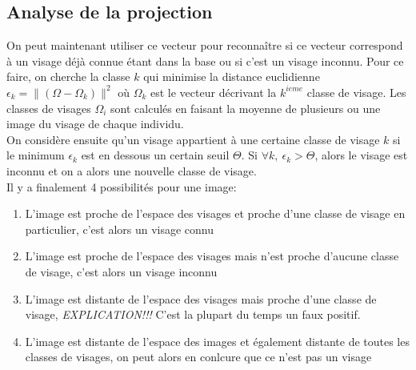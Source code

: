\documentclass[12pt,french]{article}
\begin{document}
\subsection{Analyse de la projection}
On peut maintenant utiliser ce vecteur pour reconnaître si ce vecteur correspond à un visage déjà connue étant dans la base ou si c'est un visage inconnu.
Pour ce faire, on cherche la classe $k$ qui minimise la distance euclidienne $\epsilon_k = \|(\Omega - \Omega_k)\|^2$
 où $\Omega_k$ est le vecteur décrivant la $k^{ieme}$ classe de visage. Les classes de visages $\Omega_i$ sont calculés en faisant la moyenne de plusieurs ou une image du visage de chaque individu. \\
 On considère ensuite qu'un visage appartient à une certaine classe de visage $k$ si le minimum $\epsilon_k$ est en dessous un certain seuil $\Theta$.
 Si $\forall k,~\epsilon_k > \Theta$, alors le visage est inconnu et on a alors une nouvelle classe de visage. \\
 Il y a finalement 4 possibilités pour une image:
\begin{enumerate}
  \item L'image est proche de l'espace des visages et proche d'une classe de visage en particulier, c'est alors un visage connu
  \item L'image est proche de l'espace des visages mais n'est proche d'aucune classe de visage, c'est alors un visage inconnu
  \item L'image est distante de l'espace des visages mais proche d'une classe de visage, \emph{EXPLICATION!!!} C'est la plupart du temps un faux positif.
  \item L'image est distante de l'espace des images et également distante de toutes les classes de visages, on peut alors en conlcure que ce n'est pas un visage
\end{enumerate}
\end{document}
